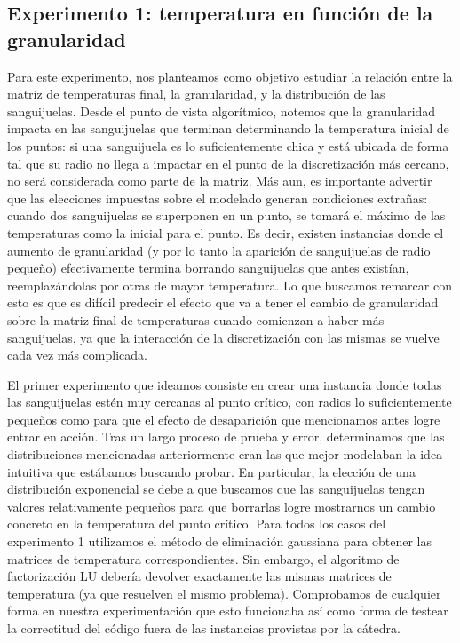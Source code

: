 \subsection{Experimento 1: temperatura en función de la granularidad}

Para este experimento, nos planteamos como objetivo estudiar la relación entre la matriz de temperaturas final, la granularidad, y la distribución de las sanguijuelas. Desde el punto de vista algorítmico, notemos que la granularidad impacta en las sanguijuelas que terminan determinando la temperatura inicial de los puntos: si una sanguijuela es lo suficientemente chica y está ubicada de forma tal que su radio no llega a impactar en el punto de la discretización más cercano, no será considerada como parte de la matriz. Más aun, es importante advertir que las elecciones impuestas sobre el modelado generan condiciones extrañas: cuando dos sanguijuelas se superponen en un punto, se tomará el máximo de las temperaturas como la inicial para el punto. Es decir, existen instancias donde el aumento de granularidad (y por lo tanto la aparición de sanguijuelas de radio pequeño) efectivamente termina borrando sanguijuelas que antes existían, reemplazándolas por otras de mayor temperatura. Lo que buscamos remarcar con esto es que es difícil predecir el efecto que va a tener el cambio de granularidad sobre la matriz final de temperaturas cuando comienzan a haber más sanguijuelas, ya que la interacción de la discretización con las mismas se vuelve cada vez más complicada.

El primer experimento que ideamos consiste en crear una instancia donde todas las sanguijuelas estén muy cercanas al punto crítico, con radios lo suficientemente pequeños como para que el efecto de desaparición que mencionamos antes logre entrar en acción. Tras un largo proceso de prueba y error, determinamos que las distribuciones mencionadas anteriormente eran las que mejor modelaban la idea intuitiva que estábamos buscando probar. En particular, la elección de una distribución exponencial se debe a que buscamos que las sanguijuelas tengan valores relativamente pequeños para que borrarlas logre mostrarnos un cambio concreto en la temperatura del punto crítico. Para todos los casos del experimento 1 utilizamos el método de eliminación gaussiana para obtener las matrices de temperatura correspondientes. Sin embargo, el algoritmo de factorización LU debería devolver exactamente las mismas matrices de temperatura (ya que resuelven el mismo problema). Comprobamos de cualquier forma en nuestra experimentación que esto funcionaba así como forma de testear la correctitud del código fuera de las instancias provistas por la cátedra.

